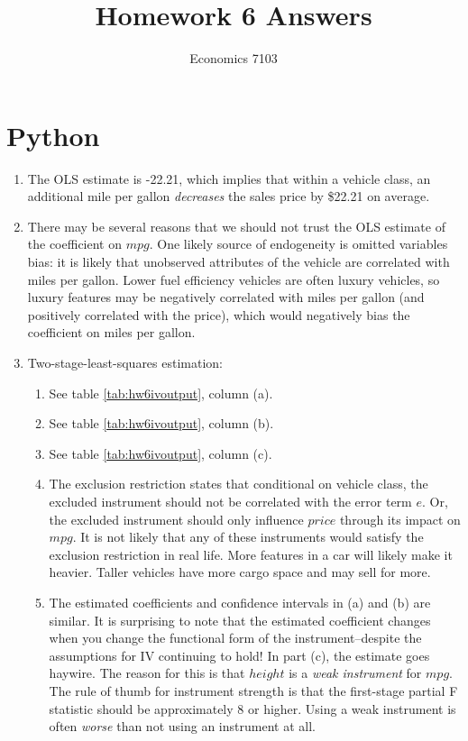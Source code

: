 \documentclass{article}
\title{Homework 6 Answers}
\author{Economics 7103}
\date{ }
\begin{document}
  
\maketitle

\section{Python}

\begin{enumerate}
    \item The OLS estimate is -22.21, which implies that within a vehicle class, an additional mile per gallon \textit{decreases} the sales price by \$22.21 on average.
    \item There may be several reasons that we should not trust the OLS estimate of the coefficient on $mpg$.  One likely source of endogeneity is omitted variables bias: it is likely that unobserved attributes of the vehicle are correlated with miles per gallon.  Lower fuel efficiency vehicles are often luxury vehicles, so luxury features may be negatively correlated with miles per gallon (and positively correlated with the price), which would negatively bias the coefficient on miles per gallon.
    \item Two-stage-least-squares estimation:
\begin{enumerate}[label=(\alph*)]
    \item See table \ref{tab:hw6ivoutput}, column (a).
    \item See table \ref{tab:hw6ivoutput}, column (b).
    \item See table \ref{tab:hw6ivoutput}, column (c).
    \item The exclusion restriction states that conditional on vehicle class, the excluded instrument should not be correlated with the error term $e$.  Or, the excluded instrument should only influence $price$ through its impact on $mpg$.  It is not likely that any of these instruments would satisfy the exclusion restriction in real life.  More features in a car will likely make it heavier.  Taller vehicles have more cargo space and may sell for more.
    \item The estimated coefficients and confidence intervals in (a) and (b) are similar.  It is surprising to note that the estimated coefficient changes when you change the functional form of the instrument--despite the assumptions for IV continuing to hold!  In part (c), the estimate goes haywire.  The reason for this is that $height$ is a \textit{weak instrument} for $mpg$.  The rule of thumb for instrument strength is that the first-stage partial F statistic should be approximately 8 or higher.  Using a weak instrument is often \textit{worse} than not using an instrument at all. 

\end{enumerate}
\end{enumerate}
\end{document}
